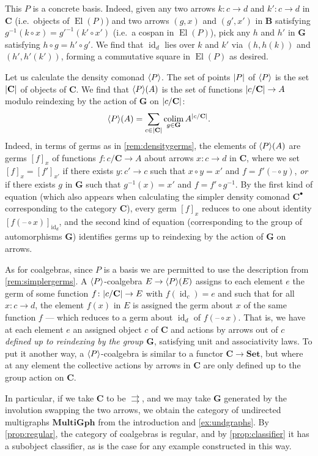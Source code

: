\documentclass[11pt, oneside, article]{memoir}
\theoremstyle{plain}
\theoremstyle{definition}
\theoremstyle{remark}
\newenvironment{example}
{\renewcommand\qedsymbol{$\lrcorner$}%
  \pushQED{\qed}\myexample}
{\popQED\endmyexample}
\DeclareMathOperator{\id}{id}
\DeclareMathOperator{\El}{El}
\DeclareMathOperator*{\colim}{colim}
\DeclarePairedDelimiter{\gen}{\langle}{\rangle}
\DeclarePairedDelimiter{\abs}{\lvert}{\rvert}
\newcommand{\dash}{{\mathord{\text{--}}}}
\newcommand{\namedcat}[1]{\mathbf{#1}}
\newcommand{\cat}[1]{\mathbf{#1}}
\newcommand{\Set}{\namedcat{Set}}
\newcommand{\MultiGph}{\namedcat{MultiGph}}
\newcommand{\pts}[1]{{\abs{#1}}}
\newcommand{\obs}[1]{\pts{#1}}
\newcommand{\ph}[1]{#1}
\newcommand{\eE}{E}
\newcommand{\xA}{A}
\newcommand{\bB}{\cat{B}}
\newcommand{\bC}{\cat{C}}
\newcommand{\bG}{\cat{G}}
\newcommand{\pP}{\ph{P}}
\newcommand{\cP}{\gen{\pP}}
\newcommand{\cbC}{\cattocmd{\bC}}
\newcommand{\cattocmd}[1]{{{#1}^\bullet}}
\begin{document}
\begin{example}[Symmetrized categories]
  This $\pP$ is a concrete basis. Indeed, given any two arrows
  $k \colon c \to d$ and $k' \colon c \to d$ in $\bC$ (i.e.\ objects of
  $\El(\pP)$) and two arrows $(g, x)$ and $(g', x')$ in $\bB$
  satisfying $g^{-1}(k \circ x) = {g'}^{-1}(k' \circ x')$ (i.e.\ a
  cospan in $\El(\pP)$), pick any $h$ and $h'$ in $\bG$ satisfying
  $h\circ g = h' \circ g'$. We find that $\id_d$ lies over $k$ and
  $k'$ via $(h, h(k))$ and $(h', h'(k'))$, forming a commutative
  square in $\El(\pP)$ as desired.

  Let us calculate the density comonad $\cP$. The set of points
  $\pts{\pP}$ of $\cP$ is the set $\obs{\bC}$ of objects of $\bC$. We
  find that $\cP(\xA)$ is the set of functions $\obs{c / \bC} \to \xA$
  modulo reindexing by the action of $\bG$ on $\obs{c / \bC}$:
  \[\cP(\xA) = \sum_{c\in \obs{\bC}} \colim_{g \in \bG} \xA^{\obs{c / \bC}}.\]
  Indeed, in terms of germs as in \cref{rem:densitygerms}, the
  elements of $\cP(\xA)$ are germs $[f]_x$ of functions
  $f \colon {c / \bC} \to \xA$ about arrows $x \colon c \to d$ in
  $\bC$, where we set $[f]_x = [f']_{x'}$ if there exists
  $y \colon c' \to c$ such that $x \circ y = x'$ and
  $f = f'(\dash \circ y)$, \emph{or} if there exists $g$ in $\bG$ such
  that $g^{-1}(x) = x'$ and $f = f' \circ g^{-1}$. By the first kind
  of equation (which also appears when calculating the simpler density
  comonad $\cbC$ corresponding to the category $\bC$), every germ
  $[f]_x$ reduces to one about identity $[f(\dash \circ x)]_{\id_d}$,
  and the second kind of equation (corresponding to the group of
  automorphisms $\bG$) identifies germs up to reindexing by the action
  of $\bG$ on arrows.
  
  As for coalgebras, since $\pP$ is a basis we are permitted to use
  the description from \cref{rem:simplergerms}. A $\cP$-coalgebra
  $\eE \to \cP(\eE)$ assigns to each element $e$ the germ of some
  function $f \colon \obs{c / \bC} \to \eE$ with $f(\id_c) = e$ and
  such that for all $x \colon c \to d$, the element $f(x)$ in $\eE$ is
  assigned the germ about $x$ of the same function $f$ --- which
  reduces to a germ about $\id_d$ of $f(\dash \circ x)$. That is, we
  have at each element $e$ an assigned object $c$ of $\bC$ and actions
  by arrows out of $c$ \emph{defined up to reindexing by the group
    $\bG$}, satisfying unit and associativity laws. To put it another
  way, a $\cP$-coalgebra is similar to a functor $\bC \to \Set$, but
  where at any element the collective actions by arrows in $\bC$ are
  only defined up to the group action on $\bC$.
  
  In particular, if we take $\bC$ to be $\rightrightarrows$, and we
  may take $\bG$ generated by the involution swapping the two arrows,
  we obtain the category of undirected multigraphs $\MultiGph$ from
  the introduction and \cref{ex:undgraphs}. By \cref{prop:regular},
  the category of coalgebras is regular, and by \cref{prop:classifier}
  it has a subobject classifier, as is the case for any example
  constructed in this way.
\end{example}
\end{document}
